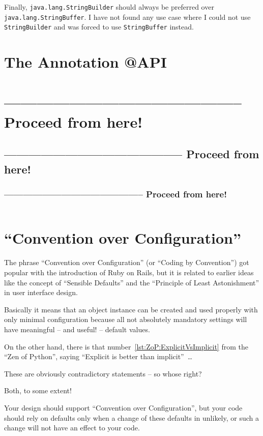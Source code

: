 \documentclass[11pt,a4paper, titlepage, parskip=half, headsepline, footsepline, cleardoublepage=current, headheight=1cm]{scrbook}
\begin{document}
Finally, \lstinline|java.lang.StringBuilder| should always be preferred over \lstinline|java.lang.StringBuffer|. I have not found any use case where I could not use \lstinline|StringBuilder| and was forced to use \lstinline|StringBuffer| instead.

\section{The Annotation @API}\label{sec:APIAnnotation}
\section{-------------------------------------------- Proceed from here!}
\subsection{-------------------------------------------- Proceed from here!}
\subsubsection{-------------------------------------------- Proceed from here!}
\lipsum[1]

\begin{lstlisting}
\end{lstlisting}

\section{“Convention over Configuration”}
The phrase “Convention over Configuration” (or “Coding by Convention”) got popular with the introduction of Ruby on Rails, but it is related to earlier ideas like the concept of “Sensible Defaults” and the “Principle of Least Astonishment” in user interface design.

Basically it means that an object instance can be created and used properly with only minimal configuration because all not absolutely mandatory settings will have meaningful – and useful! – default values.

On the other hand, there is that number~\ref{lst:ZoP:ExplicitVsImplicit} from the “Zen of Python”, saying “Explicit is better than implicit”~…

These are obviously contradictory statements – so whose right?

Both, to some extent!

Your design should support “Convention over Configuration”, but your code should rely on defaults only when a change of these defaults in unlikely, or such a change will not have an effect to your code.
\end{document}
